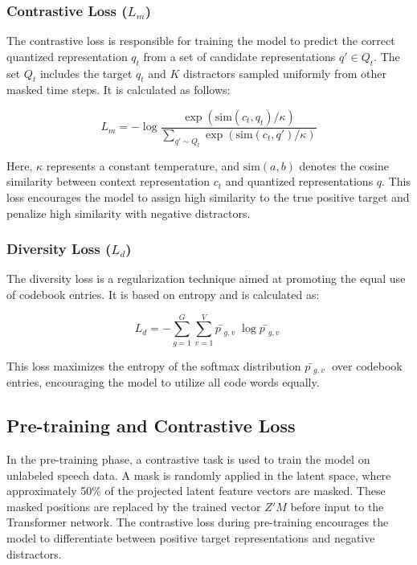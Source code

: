\subsubsection{Contrastive Loss ($L_m$)}

The contrastive loss is responsible for training the model to predict the correct quantized representation $q_t$ from a set of candidate representations $q' \in Q_t$. The set $Q_t$ includes the target $q_t$ and $K$ distractors sampled uniformly from other masked time steps. It is calculated as follows:

\begin{equation}
L_m = -\log \frac{\exp(\text{sim}(c_t, q_t) / \kappa)}{\sum_{q' \sim Q_t} \exp(\text{sim}(c_t, q') / \kappa)}
\end{equation}

Here, $\kappa$ represents a constant temperature, and $\text{sim}(a, b)$ denotes the cosine similarity between context representation $c_t$ and quantized representations $q$. This loss encourages the model to assign high similarity to the true positive target and penalize high similarity with negative distractors.

\subsubsection{Diversity Loss ($L_d$)}

The diversity loss is a regularization technique aimed at promoting the equal use of codebook entries. It is based on entropy and is calculated as:

\begin{equation}
L_d = -\sum_{g=1}^{G} \sum_{v=1}^{V} p̄_{g,v} \log p̄_{g,v}
\end{equation}

This loss maximizes the entropy of the softmax distribution $p̄_{g,v}$ over codebook entries, encouraging the model to utilize all code words equally.

\subsection{Pre-training and Contrastive Loss}

In the pre-training phase, a contrastive task is used to train the model on unlabeled speech data. A mask is randomly applied in the latent space, where approximately 50\% of the projected latent feature vectors are masked. These masked positions are replaced by the trained vector $Z'M$ before input to the Transformer network. The contrastive loss during pre-training encourages the model to differentiate between positive target representations and negative distractors.

